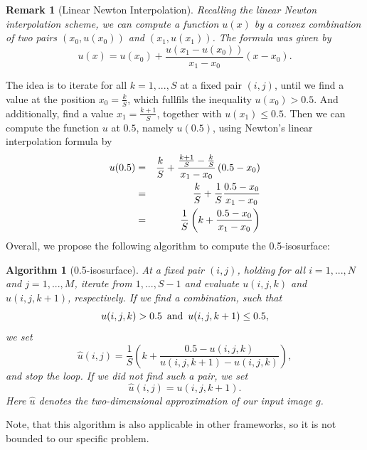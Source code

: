 \documentclass{scrreprt}
\newtheorem{remark}[theorem]{Remark}
\newtheorem{algorithm}[theorem]{Algorithm}
\begin{document}
        \begin{remark}[Linear Newton Interpolation]
            Recalling the linear Newton interpolation scheme, we can compute a function $u(x)$ by a convex combination of two pairs $(x_{0}, u(x_{0}))$ and $(x_{1}, u(x_{1}))$. The formula was given by
                $$
                    u(x) = u(x_{0}) + \frac{u(x_{1} - u(x_{0}))}{x_{1} - x_{0}}\left( x - x_{0} \right).
                $$
        \end{remark}

        The idea is to iterate for all $k = 1, ..., S$ at a fixed pair $(i,j)$, until we find a value at the position $x_{0} = \frac{k}{S}$, which fullfils the inequality $u(x_{0}) > 0.5$. And additionally, find a value $x_{1} = \frac{k+1}{S}$, together with $u(x_{1}) \le 0.5$. Then we can compute the function $u$ at $0.5$, namely $u(0.5)$, using Newton's linear interpolation formula by
            \begin{eqnarray}
                u(0.5) &=& \frac{k}{S} + \frac{\frac{k+1}{S} - \frac{k}{S}}{x_{1} - x_{0}} \left( 0.5 - x_{0} \right) \notag \\
                &=& \frac{k}{S} + \frac{1}{S} \frac{0.5 - x_{0}}{x_{1} - x_{0}} \notag \\
                &=& \frac{1}{S} \left( k + \frac{0.5 - x_{0}}{x_{1} - x_{0}} \right) \notag
            \end{eqnarray}
        Overall, we propose the following algorithm to compute the 0.5-isosurface:
        \begin{algorithm}[0.5-isosurface]
            \label{alg:0.5_isosurface}
            At a fixed pair $(i,j)$, holding for all $i = 1, ..., N$ and $j = 1, ..., M$, iterate from $1, ..., S-1$ and evaluate $u(i,j,k)$ and $u(i,j,k+1)$, respectively. If we find a combination, such that
                $$
                    u(i,j,k) > 0.5 \,\,\, \textnormal{and} \,\,\, u(i,j,k+1) \le 0.5,
                $$
            we set
                $$
                    \hat{u}(i,j) = \frac{1}{S} \left( k + \frac{0.5 - u(i,j,k)}{u(i,j,k+1) - u(i,j,k)} \right),
                $$
            and stop the loop. If we did not find such a pair, we set
                $$
                    \hat{u}(i,j) = u(i, j, k+1).
                $$
            Here $\hat{u}$ denotes the two-dimensional approximation of our input image $g$.
        \end{algorithm}

        Note, that this algorithm is also applicable in other frameworks, so it is not bounded to our specific problem.
\end{document}
